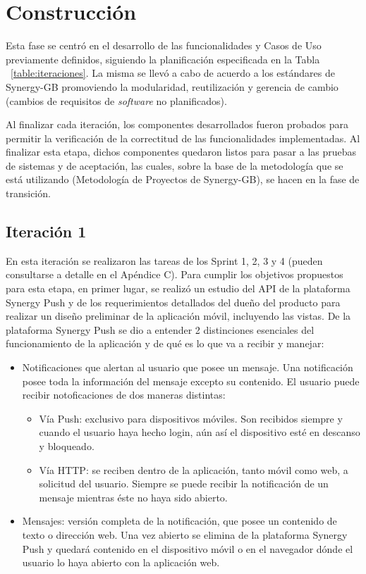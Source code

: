 \section{Construcción} \label{sect:Construccion}
Esta fase se centró en el desarrollo de las funcionalidades y Casos de Uso previamente definidos, siguiendo la planificación especificada en la Tabla ~\ref{table:iteraciones}. La misma se llevó a cabo de acuerdo a los estándares de Synergy-GB promoviendo la modularidad, reutilización y gerencia de cambio (cambios de requisitos de \textit{software} no planificados).


Al finalizar cada iteración, los componentes desarrollados fueron probados para permitir la verificación de la correctitud de las funcionalidades implementadas. Al finalizar esta etapa, dichos componentes quedaron listos para pasar a las pruebas de sistemas y de aceptación, las cuales, sobre la base de la metodología que se está utilizando (Metodología de Proyectos de Synergy-GB), se hacen en la fase de transición.


\subsection{Iteración 1}
En esta iteración se realizaron las tareas de los Sprint 1, 2, 3 y 4 (pueden consultarse a detalle en el Apéndice C). Para cumplir los objetivos propuestos para esta etapa, en primer lugar, se realizó un estudio del API de la plataforma Synergy Push y de los requerimientos detallados del dueño del producto para realizar un diseño preliminar de la aplicación móvil, incluyendo las vistas. De la plataforma Synergy Push se dio a entender 2 distinciones esenciales del funcionamiento de la aplicación y de qué es lo que va a recibir y manejar:
\smallskip
\begin{itemize}[noitemsep,nolistsep]
  \item Notificaciones que alertan al usuario que posee un mensaje. Una notificación posee toda la información del mensaje excepto su contenido. El usuario puede recibir notoficaciones de dos maneras distintas:
  \begin{itemize}[noitemsep,nolistsep]
    \item Vía Push: exclusivo para dispositivos móviles. Son recibidos siempre y cuando el usuario haya hecho login, aún así el dispositivo esté en descanso y bloqueado.
    \item Vía HTTP: se reciben dentro de la aplicación, tanto móvil como web, a solicitud del usuario. Siempre se puede recibir la notificación de un mensaje mientras éste no haya sido abierto.
  \end{itemize}
  \item Mensajes: versión completa de la notificación, que posee un contenido de texto o dirección web. Una vez abierto se elimina de la plataforma Synergy Push y quedará contenido en el dispositivo móvil o en el navegador dónde el usuario lo haya abierto con la aplicación web.
\end{itemize}
\bigskip


